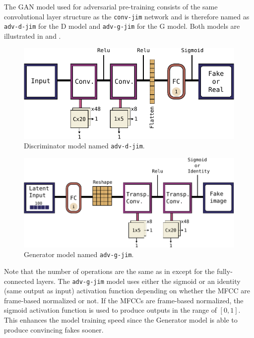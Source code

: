 The GAN model used for adversarial pre-training consists of the same convolutional layer structure as the \texttt{conv-jim} network and is therefore named as \texttt{adv-d-jim} for the D model and \texttt{adv-g-jim} for the G model. 
Both models are illustrated in  and .
\begin{figure}[!ht]
  \centering
    \includegraphics[height=0.23\textwidth]{./4_nn/figs/nn_arch_adv_d_jim.pdf}
  \caption{Discriminator model named \texttt{adv-d-jim}.}
  \label{fig:nn_arch_adv_d_jim}
\end{figure}
\FloatBarrier
\noindent
\begin{figure}[!ht]
  \centering
    \includegraphics[height=0.26\textwidth]{./4_nn/figs/nn_arch_adv_g_jim.pdf}
  \caption{Generator model named \texttt{adv-g-jim}.}
  \label{fig:nn_arch_adv_g_jim}
\end{figure}
\FloatBarrier
\noindent
Note that the number of operations are the same as in  except for the fully-connected layers.
The \texttt{adv-g-jim} model uses either the sigmoid or an identity (same output as input) activation function depending on whether the MFCC are frame-based normalized or not.
If the MFCCs are frame-based normalized, the sigmoid activation function is used to produce outputs in the range of $[0, 1]$.
This enhances the model training speed since the Generator model is able to produce convincing fakes sooner.



